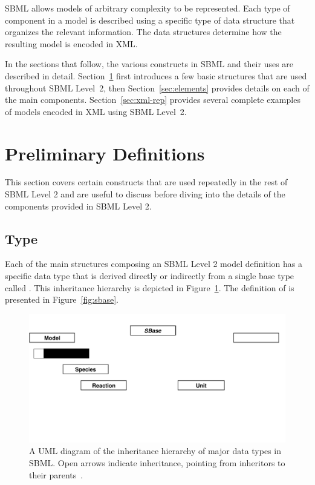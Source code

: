 \documentclass[10pt,twocolumntoc]{cekarticle}
\newcommand{\vref}[1]{\ref{#1}}
\begin{document}
SBML allows models of arbitrary complexity to be represented.  Each type of
component in a model is described using a specific type of data structure
that organizes the relevant information.  The data structures determine how
the resulting model is encoded in XML.

In the sections that follow, the various constructs in SBML and their uses
are described in detail.  Section~\ref{sec:general} first introduces a few
basic structures that are used throughout SBML Level~2, then
Section~\ref{sec:elements} provides details on each of the main components.
Section~\ref{sec:xml-rep} provides several complete examples of models
encoded in XML using SBML Level~2.


\section{Preliminary Definitions}
\label{sec:general}

This section covers certain constructs that are used repeatedly in
the rest of SBML Level 2 and are useful to discuss before diving
into the details of the components provided in SBML Level 2.

\subsection{Type }
\label{sec:sbase}

Each of the main structures composing an SBML Level 2 model definition has
a specific data type that is derived directly or indirectly from a single
base type called .  This inheritance hierarchy is depicted in
Figure~\vref{fig:top-level}.  The definition of  is presented
in Figure~\vref{fig:sbase}.

\begin{figure}[h]
  \vspace*{8pt}
  \centering
  \includegraphics[scale = 0.7]{top-level}
  \caption{A UML diagram of the inheritance hierarchy of major data types
    in SBML.  Open arrows indicate inheritance, pointing from inheritors to
    their parents~\citep{eriksson:1998,oestereich:1999}.}
  \label{fig:top-level}
\end{figure}
\end{document}
